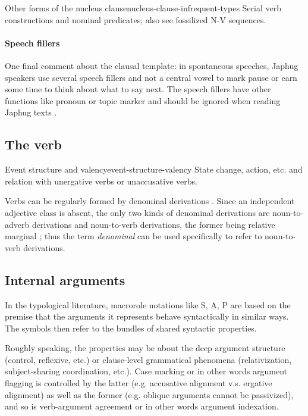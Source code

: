 \documentclass[a4paper, oneside, 12pt]{report}
\newcommand*{\citesec}[1]{\S~{#1}}
\newcommand*{\citechap}[1]{Ch~{#1}}
\newcommand*{\citepage}[1]{p.~{#1}}
\newcommand*{\term}[1]{\emph{#1}}
\begin{document}
\begin{todobox}{Other forms of the nucleus clause}{nucleus-clause-infrequent-types}
    Serial verb constructions and nominal predicates;
    also see fossilized N-V sequences. 
\end{todobox}

\paragraph*{Speech fillers}
One final comment about the clausal template:
in spontaneous speeches, Japhug speakers use several speech fillers and not a central vowel 
to mark pause or earn some time to think about what to say next.
The speech fillers have other functions like pronoun or topic marker
and should be ignored when reading Japhug texts
\citep[\citesec{10.3}]{jacques2021grammar}.

\subsection{The verb}

\begin{todobox}{Event structure and valency}{event-structure-valency}
    State change, action, etc. and relation with unergative verbs or unaccusative verbs.
\end{todobox}

Verbs can be regularly formed by denominal derivations
\citep[\citechap{20}]{jacques2021grammar}.
Since an independent adjective class is absent, 
the only two kinds of denominal derivations 
are noun-to-adverb derivations and noun-to-verb derivations,
the former being relative marginal \citep[\citepage{1011}]{jacques2021grammar};
thus the term \term{denominal} can be used specifically 
to refer to noun-to-verb derivations.

\subsection{Internal arguments}\label{sec:grammatical.clause.internal}

In the typological literature, macrorole notations like S, A, P 
are based on the premise that the arguments it represents
behave syntactically in similar ways.
The symbols then refer to the bundles of shared syntactic properties.

Roughly speaking, the properties may be about the deep argument structure
(control, reflexive, etc.) or clause-level grammatical phenomena
(relativization, subject-sharing coordination, etc.).
Case marking or in other words argument flagging 
is controlled by the latter (e.g. accusative alignment v.s. ergative alignment)
as well as the former (e.g. oblique arguments cannot be passivized),
and so is verb-argument agreement or in other words argument indexation.
\end{document}
